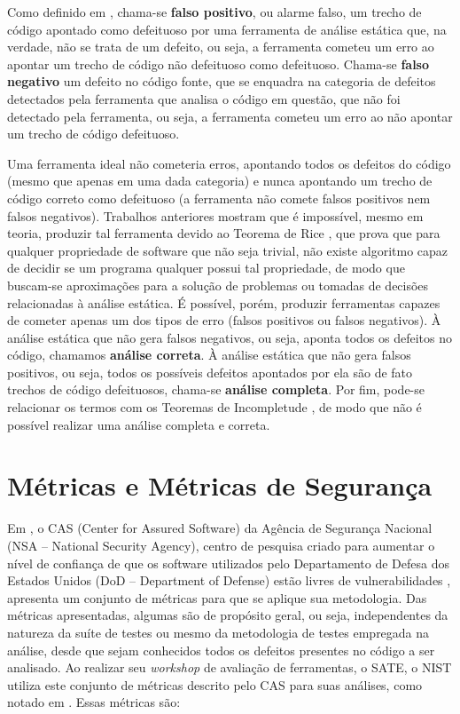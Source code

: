 Como definido em \cite{sa_spec}, chama-se \textbf{falso positivo}, ou alarme falso, um trecho de código apontado como defeituoso por uma ferramenta de análise estática que, na verdade, não se trata de um defeito, ou seja, a ferramenta cometeu um erro ao apontar um trecho de código não defeituoso como defeituoso. Chama-se \textbf{falso negativo} um defeito no código fonte, que se enquadra na categoria de defeitos detectados pela ferramenta que analisa o código em questão, que não foi detectado pela ferramenta, ou seja, a ferramenta cometeu um erro ao não apontar um trecho de código defeituoso.

Uma ferramenta ideal não cometeria erros, apontando todos os defeitos do código (mesmo que apenas em uma dada categoria) e nunca apontando um trecho de código correto como defeituoso (a ferramenta não comete falsos positivos nem falsos negativos). Trabalhos anteriores mostram que é impossível, mesmo em teoria, produzir tal ferramenta \cite{sa_spec} devido ao Teorema de Rice \cite{rice}, que prova que para qualquer propriedade de software que não seja trivial, não existe algoritmo capaz de decidir se um programa qualquer possui tal propriedade, de modo que buscam-se aproximações para a solução de problemas ou tomadas de decisões relacionadas à análise estática. É possível, porém, produzir ferramentas capazes de cometer apenas um dos tipos de erro (falsos positivos ou falsos negativos). À análise estática que não gera falsos negativos, ou seja, aponta todos os defeitos no código, chamamos \textbf{análise correta}. À análise estática que não gera falsos positivos, ou seja, todos os possíveis defeitos apontados por ela são de fato trechos de código defeituosos, chama-se \textbf{análise completa}. Por fim, pode-se relacionar os termos com os Teoremas de Incompletude \cite{godel}, de modo que não é possível realizar uma análise completa e correta.

\section{Métricas e Métricas de Segurança}

Em \cite{nsa}, o CAS (Center for Assured Software) da Agência de Segurança Nacional (NSA – National Security Agency), centro de pesquisa criado para aumentar o nível de confiança de que os software utilizados pelo Departamento de Defesa dos Estados Unidos (DoD – Department of Defense) estão livres de vulnerabilidades \cite{nsa}, apresenta um conjunto de métricas para que se aplique sua metodologia. Das métricas apresentadas, algumas são de propósito geral, ou seja, independentes da natureza da suíte de testes ou mesmo da metodologia de testes empregada na análise, desde que sejam conhecidos todos os defeitos presentes no código a ser analisado. Ao realizar seu \textit{workshop} de avaliação de ferramentas, o SATE, o NIST utiliza este conjunto de métricas descrito pelo CAS para suas análises, como notado em \cite{sate_iv}. Essas métricas são:

